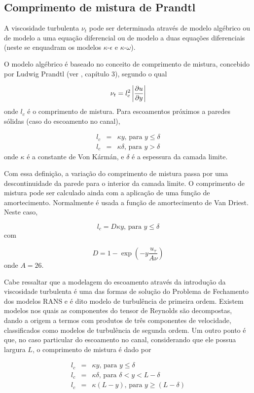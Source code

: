 \subsection{Comprimento de mistura de Prandtl}

A viscosidade turbulenta $\nu_t$ pode ser determinada através de modelo algébrico ou de modelo a uma equação diferencial ou de modelo a duas equações diferenciais (neste se enquadram os modelos $\kappa$-$\epsilon$ e $\kappa$-$\omega$).

O modelo algébrico é baseado no conceito de comprimento de mistura, concebido por Ludwig Prandtl (ver \citet{FREIRE02}, capítulo 3), segundo o qual

\begin{equation}
  \nu_t = l_c^2\left|\frac{\partial u}{\partial y}\right|
\end{equation}
onde $l_c$ é o comprimento de mistura. Para escoamentos próximos a paredes sólidas (caso do escoamento no canal), 

\begin{subequations}
  \begin{eqnarray}
    l_c&=&\kappa y\text{, para }y\leq\delta\\
    l_c&=&\kappa \delta\text{, para }y>\delta
  \end{eqnarray}
\end{subequations}
onde $\kappa$ é a constante de Von Kármán, e $\delta$ é a espessura da camada limite.

Com essa definição, a variação do comprimento de mistura passa por uma descontinuidade da parede para o interior da camada limite. O comprimento de mistura pode ser calculado ainda com a aplicação de uma função de amortecimento. Normalmente é usada a função de amortecimento de Van Driest. Neste caso,

\begin{equation}
  l_c=D\kappa y\text{, para }y\leq\delta
\end{equation}
com

\begin{equation}
  D = 1-\exp\left(-y\frac{u_{\tau}}{A\nu}\right)
\end{equation}
onde $A = 26$.

Cabe ressaltar que a modelagem do escoamento através da introdução da viscosidade turbulenta é uma das formas de solução do Problema de Fechamento dos modelos RANS e é dito modelo de turbulência de primeira ordem. Existem modelos nos quais as componentes do tensor de Reynolds são decompostas, dando a origem a termos com produtos de três componentes de velocidade, classificados como modelos de turbulência de segunda ordem. Um outro ponto é que, no caso particular do escoamento no canal, considerando que ele possua largura $L$, o comprimento de mistura é dado por

\begin{subequations}
  \begin{eqnarray}
    l_c &=& \kappa y\text{, para }y\leq\delta\\
    l_c &=& \kappa \delta\text{, para }\delta<y<L-\delta\\
    l_c &=& \kappa(L-y)\text{, para }y\geq(L-\delta)
  \end{eqnarray}
\end{subequations}


